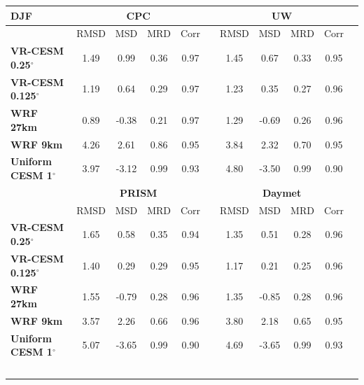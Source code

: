 \begin{table}
\begin{center}
\begin{tabular*}{6.5in}{l @{\extracolsep{\fill}}cccccccccc}
\hline \textbf{DJF} & \multicolumn{4}{c}{\textbf{CPC}} & & \multicolumn{4}{c}{\textbf{UW}} \\
\hline $    $ & RMSD & MSD & MRD & Corr & & RMSD & MSD & MRD & Corr \\
\hline \textbf{VR-CESM 0.25$^\circ$} & 1.49 & 0.99 & 0.36 & 0.97 & & 1.45 & 0.67 & 0.33 & 0.95 \\
\textbf{VR-CESM 0.125$^\circ$} & 1.19 & 0.64 & 0.29 & 0.97 & & 1.23 & 0.35 & 0.27 & 0.96 \\
\textbf{WRF 27km} & 0.89 & -0.38 & 0.21 & 0.97 & & 1.29 & -0.69 & 0.26 & 0.96 \\
\textbf{WRF 9km} & 4.26 & 2.61 & 0.86 & 0.95 & & 3.84 & 2.32 & 0.70 & 0.95 \\
\textbf{Uniform CESM 1$^\circ$} & 3.97 & -3.12 & 0.99 & 0.93 & & 4.80 & -3.50 & 0.99 & 0.90 \\
\hline  & \multicolumn{4}{c}{\textbf{PRISM}} & & \multicolumn{4}{c}{\textbf{Daymet}} \\
\hline $    $ & RMSD & MSD & MRD & Corr & & RMSD & MSD & MRD & Corr \\
\hline \textbf{VR-CESM 0.25$^\circ$} & 1.65 & 0.58 & 0.35 & 0.94 & & 1.35 & 0.51 & 0.28 & 0.96 \\
\textbf{VR-CESM 0.125$^\circ$} & 1.40 & 0.29 & 0.29 & 0.95 & & 1.17 & 0.21 & 0.25 & 0.96 \\
\textbf{WRF 27km} & 1.55 & -0.79 & 0.28 & 0.96 & & 1.35 & -0.85 & 0.28 & 0.96 \\
\textbf{WRF 9km} & 3.57 & 2.26 & 0.66 & 0.96 & & 3.80 & 2.18 & 0.65 & 0.95 \\
\textbf{Uniform CESM 1$^\circ$} & 5.07 & -3.65 & 0.99 & 0.90 & & 4.69 & -3.65 & 0.99 & 0.93 \\
\hline
\
\end{tabular*}

\end{center}
\end{table}


